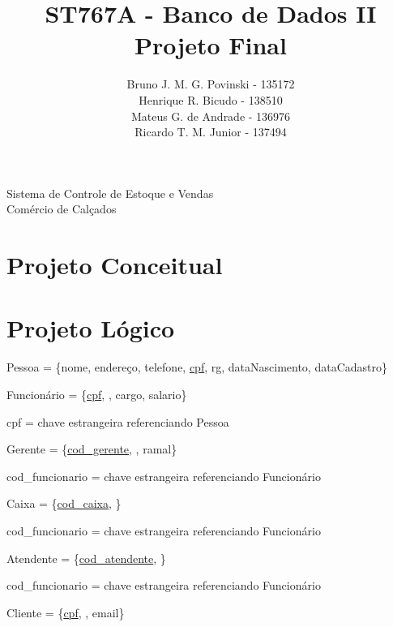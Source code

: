 \documentclass[a4paper,12pt]{article}
\title{ST767A - Banco de Dados II \\ Projeto Final}
\author{Bruno J. M. G. Povinski - 135172 \\ Henrique R. Bicudo - 138510 \\ Mateus G. de Andrade - 136976 \\ Ricardo T. M. Junior - 137494}
\date{}
\begin{document}
	\maketitle
	
	\begin{center}
		\begin{Large}
			Sistema de Controle de Estoque e Vendas \\ Comércio de Calçados
		\end{Large}
	\end{center}
	
	\section{Projeto Conceitual}
	\newpage
	\section{Projeto Lógico}
	\begin{flushleft}
		Pessoa = \{nome, endereço, telefone, \uline{cpf}, rg, dataNascimento, dataCadastro\}
	\end{flushleft}
	\begin{flushleft}
		Funcionário = \{\uline{cpf}, , cargo, salario\}
	\end{flushleft}
	
	cpf = chave estrangeira referenciando Pessoa
	
	\begin{flushleft}
		Gerente = \{\uline{cod\_gerente}, , ramal\}
	\end{flushleft}
	
	cod\_funcionario = chave estrangeira referenciando Funcionário
	
	\begin{flushleft}
		Caixa = \{\uline{cod\_caixa}, \uuline{cod\_funcionario}\}
	\end{flushleft}
	
	cod\_funcionario = chave estrangeira referenciando Funcionário
	
	\begin{flushleft}
		Atendente = \{\uline{cod\_atendente}, \}
	\end{flushleft}
	
	cod\_funcionario = chave estrangeira referenciando Funcionário
	
	\begin{flushleft}
		Cliente = \{\uline{cpf}, , email\}
	\end{flushleft}
	
\end{document}
